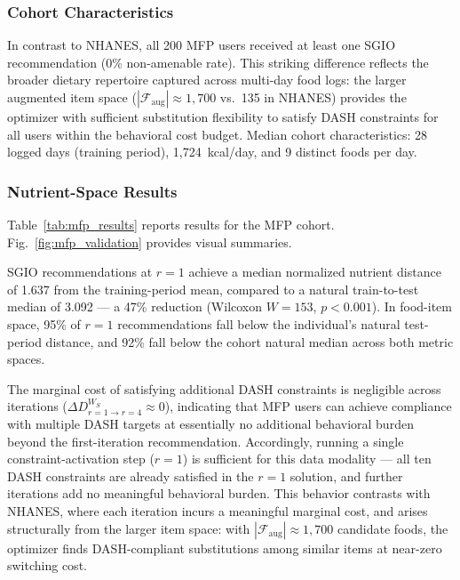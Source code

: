 \documentclass[journal]{IEEEtran}
\newcommand{\Faug}{\mathcal{F}_{\mathrm{aug}}}
\newcommand{\bW}{W_S}
\begin{document}
\subsubsection{Cohort Characteristics}

In contrast to NHANES, all 200 MFP users received at least one SGIO
recommendation (0\% non-amenable rate). This striking difference reflects
the broader dietary repertoire captured across multi-day food logs: the
larger augmented item space ($|\Faug| \approx 1{,}700$ vs.\ 135 in
NHANES) provides the optimizer with sufficient substitution flexibility
to satisfy DASH constraints for all users within the behavioral cost
budget. Median cohort characteristics: 28 logged days (training
period), 1,724~kcal/day, and 9 distinct foods per day.

\subsubsection{Nutrient-Space Results}

Table~\ref{tab:mfp_results} reports results for the MFP cohort.
Fig.~\ref{fig:mfp_validation} provides visual summaries.

SGIO recommendations at $r{=}1$ achieve a median normalized nutrient
distance of 1.637 from the training-period mean, compared to a natural
train-to-test median of 3.092 --- a 47\% reduction (Wilcoxon $W{=}153$,
$p{<}0.001$). In food-item space, 95\% of $r{=}1$ recommendations fall
below the individual's natural test-period distance, and 92\% fall below
the cohort natural median across both metric spaces.

The marginal cost of satisfying additional DASH constraints is negligible
across iterations ($\Delta D^{\bW}_{r=1 \to r=4} \approx 0$), indicating
that MFP users can achieve compliance with multiple DASH targets at
essentially no additional behavioral burden beyond the first-iteration recommendation.
Accordingly, running a single constraint-activation step ($r{=}1$) is
sufficient for this data modality --- all ten DASH constraints are
already satisfied in the $r{=}1$ solution, and further iterations add
no meaningful behavioral burden. This behavior contrasts with NHANES, where each iteration
incurs a meaningful marginal cost, and arises structurally from the
larger item space: with $|\Faug| \approx 1{,}700$ candidate foods, the
optimizer finds DASH-compliant substitutions among similar items at
near-zero switching cost.
\end{document}
